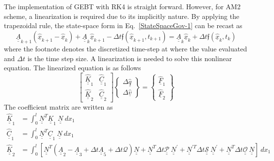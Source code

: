 \documentclass{aiaa-tc}
\newcommand{\tens}[1]{\underline{\underline{#1}}}
\renewcommand{\vec}[1]{\underline{#1}}
\begin{document}
The implementation of GEBT with RK4 is straight forward. However, for AM2 scheme, a linearization is required due to its implicitly nature. By applying the trapezoidal rule, the state-space form in Eq.~\eqref{StateSpaceGov-1} can be recast as
\begin{equation}
    \label{AM2-Govn}
    \tens{A}_{k+1} (\hat{\vec{x}}_{k+1}-\hat{\vec{x}}_{k})+\tens{A}_k \hat{\vec{x}}_{k+1} - \Delta t \mathfrak{f}(\hat{\vec{x}}_{k+1},t_{k+1}) = \tens{A}_k \hat{\vec{x}}_{k} + \Delta t \mathfrak{f}(\hat{\vec{x}}_{k},t_{k}) 
\end{equation}
where the footnote denotes the discretized time-step at where the value evaluated and $\Delta t$ is the time step size. A linearization is needed to solve this nonlinear equation. The linearized equation is as follows
\begin{equation}
    \label{AM2-Linearized}
    \begin{bmatrix}
    \hat{\tens{K}}_1 & \hat{\tens{C}}_1 \\
    \hat{\tens{K}}_2 & \hat{\tens{C}}_2
    \end{bmatrix}
    \begin{Bmatrix}
    \Delta \hat{\vec{q}} \\
    \Delta \hat{\vec{v}}
    \end{Bmatrix}
    =
    \begin{Bmatrix}
    \hat{\vec{F}}_1 \\
    \hat{\vec{F}}_2
    \end{Bmatrix}
\end{equation}
The coefficient matrix are written as
\begin{align}
    \label{Linear-K1}
    \hat{\tens{K}}_1 &= \int_0^l \tens{N}^T\tens{K}_1~\tens{N}~dx_1 \\
    \label{Linear-C1} 
    \hat{\tens{C}}_1 &= \int_0^l \tens{N}^T\tens{C}_1~\tens{N}~dx_1 \\
    \label{Linear-K2}
    \hat{\tens{K}}_2 &= \int_0^l \left[ \tens{N}^T (\tens{A}_2 - \tens{A}_3 + \Delta t \tens{A}_5 + \Delta t \mathcal{Q}) \tens{N} + \tens{N}^T \Delta t \tens{\mathcal{P}}~ \tens{N}^\prime + \tens{N}^{\prime T} \Delta t \tens{\mathcal{S}}~ \tens{N}^\prime + \tens{N}^T \Delta t \tens{\mathcal{O}}~ \tens{N} \right]~dx_1 \\
    \label{Linear-C2}
    
\end{align}
\end{document}
